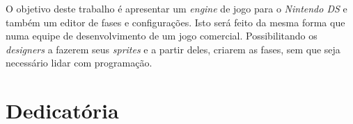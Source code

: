 \documentclass[brazil]{abnt}
\begin{document}

\Ncapa
\NFolhaDeRosto



\begin{resumo}
O objetivo deste trabalho é apresentar um \textit{engine} de jogo para o \textit{Nintendo DS\texttrademark} e também um editor de fases e configurações. Isto será feito da mesma forma que numa equipe de desenvolvimento de um jogo comercial. Possibilitando os \textit{designers} a fazerem seus \textit{sprites} e a partir deles, criarem as fases, sem que seja necessário lidar com programação.
\end{resumo}

\begin{abstract}
The objective of this paper is to create a game engine to the Nintendo DS\texttrademark system and a level and configuration editor, as it would be done in a development team of a comercial game, giving designers the possibility to make their sprites and build their levels without touching actual source code.
\end{abstract}

\chapter*{Dedicatória}
\end{document}
